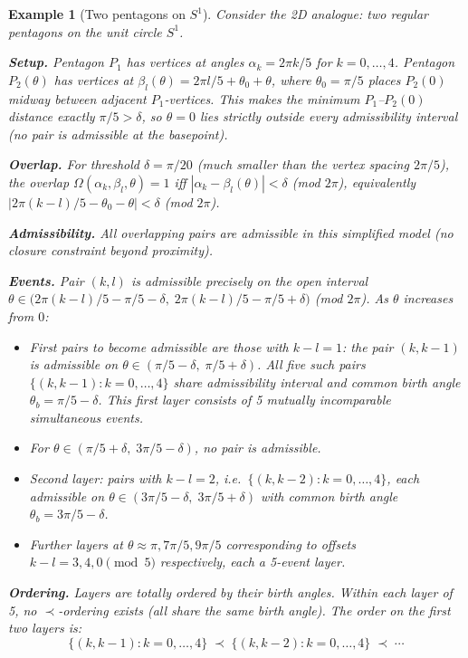 \documentclass[12pt]{article}
\newtheorem{example}[theorem]{Example}
\begin{document}
\begin{example}[Two pentagons on $S^1$]\label{ex:pentagon}
Consider the 2D analogue: two regular pentagons on the unit circle $S^1$.

\textbf{Setup.} Pentagon $P_1$ has vertices at angles $\alpha_k = 2\pi k/5$ for $k = 0, \ldots, 4$. Pentagon $P_2(\theta)$ has vertices at $\beta_l(\theta) = 2\pi l/5 + \theta_0 + \theta$, where $\theta_0 = \pi/5$ places $P_2(0)$ midway between adjacent $P_1$-vertices. This makes the minimum $P_1$--$P_2(0)$ distance exactly $\pi/5 > \delta$, so $\theta = 0$ lies strictly outside every admissibility interval (no pair is admissible at the basepoint).

\textbf{Overlap.} For threshold $\delta = \pi/20$ (much smaller than the vertex spacing $2\pi/5$), the overlap $\Omega(\alpha_k, \beta_l, \theta) = 1$ iff $|\alpha_k - \beta_l(\theta)| < \delta$ (mod $2\pi$), equivalently $|2\pi(k-l)/5 - \theta_0 - \theta| < \delta$ (mod $2\pi$).

\textbf{Admissibility.} All overlapping pairs are admissible in this simplified model (no closure constraint beyond proximity).

\textbf{Events.} Pair $(k, l)$ is admissible precisely on the open interval $\theta \in \bigl(2\pi(k-l)/5 - \pi/5 - \delta, \; 2\pi(k-l)/5 - \pi/5 + \delta\bigr)$ (mod $2\pi$). As $\theta$ increases from $0$:
\begin{itemize}
    \item First pairs to become admissible are those with $k - l = 1$: the pair $(k, k{-}1)$ is admissible on $\theta \in (\pi/5 - \delta, \; \pi/5 + \delta)$. All five such pairs $\{(k, k{-}1) : k = 0, \ldots, 4\}$ share admissibility interval and common birth angle $\theta_b = \pi/5 - \delta$. This first layer consists of 5 mutually incomparable simultaneous events.
    \item For $\theta \in (\pi/5 + \delta, \;3\pi/5 - \delta)$, no pair is admissible.
    \item Second layer: pairs with $k - l = 2$, i.e.\ $\{(k, k{-}2) : k = 0, \ldots, 4\}$, each admissible on $\theta \in (3\pi/5 - \delta, \;3\pi/5 + \delta)$ with common birth angle $\theta_b = 3\pi/5 - \delta$.
    \item Further layers at $\theta \approx \pi, 7\pi/5, 9\pi/5$ corresponding to offsets $k - l = 3, 4, 0 \pmod 5$ respectively, each a 5-event layer.
\end{itemize}

\textbf{Ordering.} Layers are totally ordered by their birth angles. Within each layer of 5, no $\prec$-ordering exists (all share the same birth angle). The order on the first two layers is:
\[
    \{(k, k{-}1) : k = 0,\ldots,4\} \;\prec\; \{(k, k{-}2) : k = 0,\ldots,4\} \;\prec\; \cdots
\]


\end{example}
\end{document}
